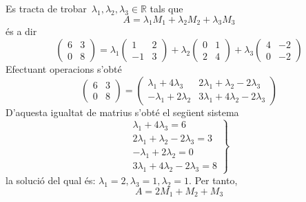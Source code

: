 \begin{solucio}
Es tracta de trobar\ $\lambda _{1},\lambda _{2},\lambda _{3}\in \mathbb{R}$
tals que%
\begin{equation*}
A=\lambda _{1}M_{1}+\lambda _{2}M_{2}+\lambda _{3}M_{3}
\end{equation*}%
és a dir%
\begin{equation*}
\left(
\begin{array}{cc}
6 & 3 \\
0 & 8%
\end{array}%
\right) =\lambda _{1}\left(
\begin{array}{cc}
1 & 2 \\
-1 & 3%
\end{array}%
\right) +\lambda _{2}\left(
\begin{array}{cc}
0 & 1 \\
2 & 4%
\end{array}%
\right) +\lambda _{3}\left(
\begin{array}{cc}
4 & -2 \\
0 & -2%
\end{array}%
\right)
\end{equation*}%
Efectuant operacions s’obté%
\begin{equation*}
\left(
\begin{array}{cc}
6 & 3 \\
0 & 8%
\end{array}%
\right) =\left(
\begin{array}{cc}
\lambda _{1}+4\lambda _{3} & 2\lambda _{1}+\lambda _{2}-2\lambda _{3} \\
-\lambda _{1}+2\lambda _{2} & 3\lambda _{1}+4\lambda _{2}-2\lambda _{3}%
\end{array}%
\right)
\end{equation*}%
D'aquesta igualtat de matrius s’obté el següent sistema%
\begin{equation*}
\left.
\begin{array}{r}
\lambda _{1}+4\lambda _{3}=6 \\
2\lambda _{1}+\lambda _{2}-2\lambda _{3}=3 \\
-\lambda _{1}+2\lambda _{2}=0 \\
3\lambda _{1}+4\lambda _{2}-2\lambda _{3}=8%
\end{array}%
\right\}
\end{equation*}%
la solució del qual és: $\lambda _{1}=2,\lambda _{3}=1,\lambda _{2}=1$. Per
tanto,%
\begin{equation*}
A=2M_{1}+M_{2}+M_{3}
\end{equation*}
\end{solucio}

